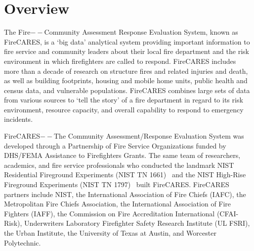 \documentclass[12pt,oneside]{book}
\begin{document}



\newpage

\cleardoublepage



\renewcommand*\contentsname{\color{fc_blue}Contents}
\tableofcontents

\hypersetup{ 
    linkcolor=fc_orange,         %
    filecolor=fc_orange,      %
    urlcolor=fc_orange,           %
}    

\newpage
\mainmatter

\chapter{Overview}

The Fire$--$Community Assessment Response Evaluation System, known as FireCARES, is a `big data' analytical system providing important information to fire service and community leaders about their local fire department and the risk environment in which firefighters are called to respond. FireCARES includes more than a decade of research on structure fires and related injuries and death, as well as building footprints, housing and mobile home units, public health and census data, and vulnerable populations. FireCARES combines large sets of data from various sources to `tell the story' of a fire department in regard to its risk environment, resource capacity, and overall capability to respond to emergency
incidents.

FireCARES$--$The Community Assessment/Response Evaluation System was developed through a Partnership of Fire Service Organizations funded by DHS/FEMA Assistance to Firefighters Grants. The same team of researchers, academics, and fire service professionals who conducted the landmark NIST Residential Fireground Experiments (NIST TN 1661)~\cite{NIST:Residential} and the NIST High-Rise Fireground Experiments (NIST TN 1797)~\cite{NIST:HighRise} built FireCARES. FireCARES partners include NIST, the International Association of Fire Chiefs (IAFC), the Metropolitan Fire Chiefs Association, the International Association of Fire Fighters (IAFF), the Commission on Fire Accreditation International (CFAI-Risk), Underwriters Laboratory Firefighter Safety Research Institute (UL FSRI), the Urban Institute, the University of Texas at Austin, and Worcester Polytechnic.
\end{document}
